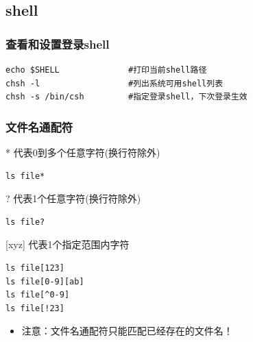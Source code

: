 \documentclass[xcolor=svgnames,presentation]{beamer}
\begin{document}
\subsection{shell}
\label{sec-2-1}
\begin{frame}[fragile]
\frametitle{查看和设置登录shell}
\label{sec-2-1-1}


\begin{verbatim}
echo $SHELL              #打印当前shell路径
chsh -l                  #列出系统可用shell列表
chsh -s /bin/csh         #指定登录shell，下次登录生效
\end{verbatim}
\end{frame}
\begin{frame}[fragile]
\frametitle{文件名通配符}
\label{sec-2-1-2}
\begin{exampleblock}{* 代表0到多个任意字符(换行符除外)}
\label{sec-2-1-2-1}


\begin{verbatim}
ls file*
\end{verbatim}
\end{exampleblock}
\begin{block}{? 代表1个任意字符(换行符除外)}
\label{sec-2-1-2-2}


\begin{verbatim}
ls file?
\end{verbatim}
\end{block}
\begin{exampleblock}{[xyz] 代表1个指定范围内字符}
\label{sec-2-1-2-3}


\begin{verbatim}
ls file[123]
ls file[0-9][ab]
ls file[^0-9]
ls file[!23]
\end{verbatim}
\end{exampleblock}
\begin{itemize}

\item 注意：文件名通配符只能匹配已经存在的文件名！
\label{sec-2-1-2-4}%
\end{itemize} %
\end{frame}
\end{document}
